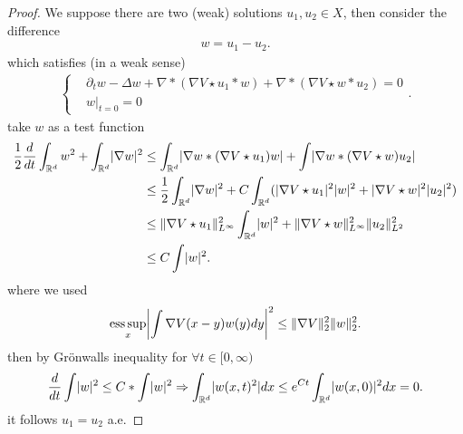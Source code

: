\begin{proof}
 We suppose there are two (weak) solutions $u_{1},u_{2} \in  X$, then consider the difference 
 \begin{align*}
  w = u_{1} - u_{2}
 .\end{align*}
 which satisfies  (in a weak sense)
 \begin{align*}
  \begin{cases}
    &\partial_t w - \Delta w + \nabla *(\nabla V \star  u_{1} * w) + \nabla*(\nabla V \star w * u_{2}) = 0\\
    &w \rvert_{t=0} = 0
  \end{cases}
 .\end{align*}
take $w$ as a test function 
\begin{align*}
  \frac{1}{2} \frac{d}{dt} \int_{\mathbb{R}^{d} } w^2+ \int_{\mathbb{R}^{d} } \abs{\nabla w}^2 &\le \int_{\mathbb{R}^{d} } \abs{\nabla w *(\nabla V \star  u_{1})w}   + \int  \abs{\nabla w * (\nabla V \star  w)u_{2}} \\
                                                                                               &\le  \frac{1}{2} \int_{\mathbb{R}^{d} } \abs{\nabla w}^2 + C\int_{\mathbb{R}^{d} } (\abs{\nabla V \star  u_{1}}^2 \abs{w}^2 + \abs{\nabla V \star  w}^2 \abs{u_{2}}^2)\\
                                                                                               &\le  \|\nabla V \star  u_{1}\|_{L^{\infty}}^2 \int_{\mathbb{R}^{d} }  \abs{w}^2 + \|\nabla V \star  w\|_{L^\infty}^2 \|u_2\|_{L^{2} }^2\\
                                                                                               &\le C \int \abs{w}^2 %
.\end{align*}
where we used
\begin{align*}
  \essup_{x} \abs*{\int  \nabla V(x-y)w(y) dy}^2 \le \|\nabla V\|_2^{2}\|w\|_2^{2}  
.\end{align*}
then by Grönwalls inequality for $\forall  t \in  [0,\infty)$
\begin{align*}
  \frac{d}{dt} \int \lvert w\rvert^2 \le C*\int \lvert w\rvert^2 \Rightarrow \int_{\mathbb{R}^{d} }\lvert w(x,t)^2\rvert dx \le  e^{Ct} \int_{\mathbb{R}^{d} } \lvert w(x,0)\rvert^2 dx = 0
.\end{align*}
it follows $u_{1}=u_{2}$ a.e.
\end{proof}
